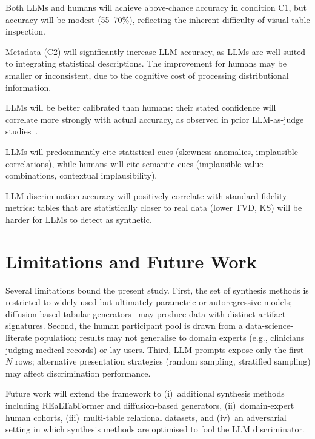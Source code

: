 \documentclass[runningheads]{llncs}
\begin{document}
\begin{description}[leftmargin=0pt,itemsep=4pt]
  \item[$H_1$] Both LLMs and humans will achieve above-chance accuracy
    in condition C1, but accuracy will be modest (55--70\%), reflecting
    the inherent difficulty of visual table inspection.
  \item[$H_2$] Metadata (C2) will significantly increase LLM accuracy,
    as LLMs are well-suited to integrating statistical descriptions.
    The improvement for humans may be smaller or inconsistent,
    due to the cognitive cost of processing distributional information.
  \item[$H_3$] LLMs will be better calibrated than humans:
    their stated confidence will correlate more strongly with actual
    accuracy, as observed in prior LLM-as-judge studies~\cite{zheng2023judging}.
  \item[$H_4$] LLMs will predominantly cite statistical cues
    (skewness anomalies, implausible correlations),
    while humans will cite semantic cues
    (implausible value combinations, contextual implausibility).
  \item[$H_5$] LLM discrimination accuracy will positively
    correlate with standard fidelity metrics: tables that are
    statistically closer to real data (lower TVD, KS) will be
    harder for LLMs to detect as synthetic.
\end{description}

\section{Limitations and Future Work}
\label{sec:discussion}

Several limitations bound the present study.
First, the set of synthesis methods is restricted to widely used but
ultimately parametric or autoregressive models; diffusion-based
tabular generators~\cite{jolicoeur2023generating} may produce data
with distinct artifact signatures.
Second, the human participant pool is drawn from a data-science-literate
population; results may not generalise to domain experts (e.g.,
clinicians judging medical records) or lay users.
Third, LLM prompts expose only the first $N$ rows; alternative
presentation strategies (random sampling, stratified sampling) may
affect discrimination performance.

Future work will extend the framework to (i)~additional synthesis
methods including REaLTabFormer and diffusion-based generators,
(ii)~domain-expert human cohorts, (iii)~multi-table relational datasets,
and (iv)~an adversarial setting in which synthesis methods are
optimised to fool the LLM discriminator.
\end{document}
